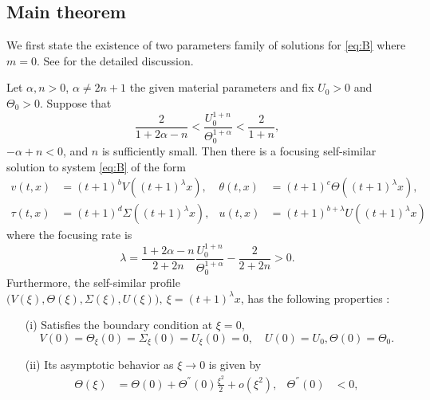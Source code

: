 \documentclass[graybox]{svmult}
\begin{document}
\subsection{Main theorem}

We first state the existence of two parameters family of solutions for \eqref{eq:B}  where $m=0$. See \cite{LT16_2} for the detailed discussion.
\begin{theorem} \label{thm1}
Let $\alpha,n>0$, $\alpha\ne2n+1$ the given material parameters and fix $U_0>0$ and $\Theta_0>0$. Suppose that
\begin{equation} \label{eq:restriction}
 \frac{2}{1+2\alpha-n} < \frac{U_0^{1+n}}{\Theta_0^{1+\alpha}} < \frac{2}{1+n},
\end{equation}
$-\alpha+n<0$, and $n$ is sufficiently small. Then there is a focusing self-similar solution to system \eqref{eq:B} of the form
\begin{equation*}
\begin{aligned}
 v(t,x) &= (t+1)^b V((t+1)^\lambda x), &\theta(t,x) &= (t+1)^c \Theta((t+1)^\lambda x),\\
 \tau(t,x) &= (t+1)^d \Sigma((t+1)^\lambda x), & u(t,x) &= (t+1)^{b+\lambda} U((t+1)^\lambda x)
\end{aligned}
\end{equation*}
where the focusing rate is 
\begin{equation}
 \lambda = \frac{1+2\alpha-n}{2+2n}\frac{U_0^{1+n}}{\Theta_0^{1+\alpha}} - \frac{2}{2+2n}>0. \label{eq:lambda}
\end{equation}
Furthermore, the self-similar profile $\big(V(\xi),\Theta(\xi),\Sigma(\xi),U(\xi)\big), \ \xi = (t+1)^\lambda x$,  has the  following properties :
 \begin{enumerate}
  \item[(i)] Satisfies the boundary condition at $\xi=0$,
    \begin{equation*}
    {V}(0) = \Theta_\xi(0)=\Sigma_\xi(0) = {U}_\xi(0)=0, \quad U(0)=U_0, \Theta(0)=\Theta_0.
  \end{equation*}
  \item[(ii)] Its asymptotic behavior as $\xi \rightarrow 0$ is given by 
  \begin{equation} \label{eq:ss_asymp0}
  \begin{aligned}
    \Theta(\xi) &= \Theta(0) + \Theta^{''}(0)\frac{\xi^2}{2} + o(\xi^2), & \Theta^{''}(0)&<0,\\

\end{aligned}
\end{equation}
\end{enumerate}
\end{theorem}
\end{document}
